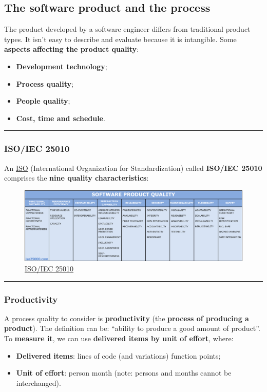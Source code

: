 \documentclass[a4paper]{article}
\newcommand{\dquotes}[1]{``#1''}
\newcommand{\longline}{\noindent\rule{\textwidth}{0.4pt}}
\begin{document}
    \subsection{The software product and the process}

    The product developed by a software engineer differs from traditional product types. It isn't easy to describe and evaluate because it is intangible. Some \textbf{aspects affecting the product quality}:
    \begin{itemize}
        \item \textbf{Development technology};
        \item \textbf{Process quality};
        \item \textbf{People quality};
        \item \textbf{Cost, time and schedule}.
    \end{itemize}

    \longline

    \subsubsection{ISO/IEC 25010}

    An \href{https://en.wikipedia.org/wiki/International_Organization_for_Standardization}{ISO} (International Organization for Standardization) called \textbf{ISO/IEC 25010} comprises the \textbf{nine quality characteristics}:
    \begin{figure}[!htp]
        \centering
        \includegraphics[width=\textwidth]{img/iso_25010_en.png}
        \caption{\href{https://iso25000.com/index.php/en/iso-25000-standards/iso-25010}{ISO/IEC 25010}}
    \end{figure}

    \longline

    \subsubsection{Productivity}

    A process quality to consider is \textbf{productivity} (the \textbf{process of producing a product}). The definition can be: \dquotes{ability to produce a good amount of product}. To \textbf{measure it}, we can use \textbf{delivered items by unit of effort}, where:
    \begin{itemize}
        \item \textbf{Delivered items}: lines of code (and variations) function points;
        \item \textbf{Unit of effort}: person month (note: persons and months cannot be interchanged).
    \end{itemize}
\end{document}
